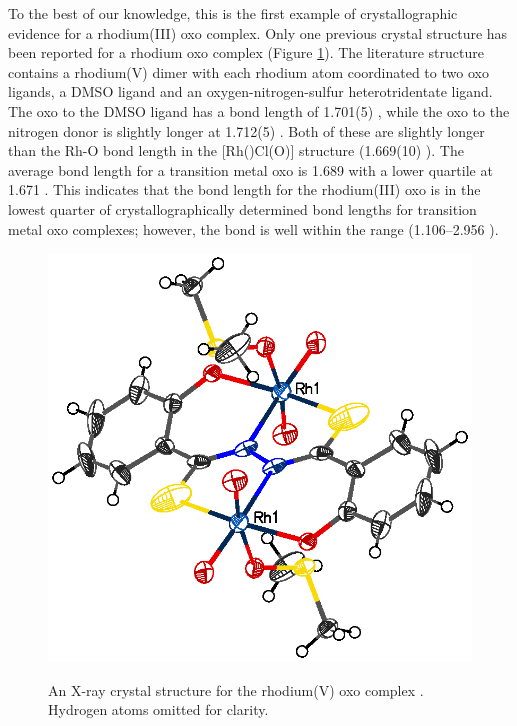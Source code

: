 To the best of our knowledge, this is the first example of crystallographic evidence for a rhodium(III) oxo complex. Only one previous crystal structure has been reported for a rhodium oxo complex (Figure \ref{Kaczul}).\cite{Gangopadhyay2010}  The literature structure contains a rhodium(V) dimer with each rhodium atom coordinated to two oxo ligands, a DMSO ligand and an oxygen-nitrogen-sulfur heterotridentate ligand.  The oxo \trans{} to the DMSO ligand has a bond length of 1.701(5) \A, while the oxo \trans{} to the nitrogen donor is slightly longer at 1.712(5) \A.  Both of these are slightly longer than the Rh-O bond length in the [Rh(\tBuxantphos)Cl(O)] structure (1.669(10) \A).  The average bond length for a transition metal oxo is 1.689 \A{} with a lower quartile at 1.671 \A.\cite{Allen2002}  This indicates that the bond length for the rhodium(III) oxo is in the lowest quarter of crystallographically determined bond lengths for transition metal oxo complexes; however, the bond is well within the range (1.106--2.956 \A).  

\begin{figure}[htb]
\begin{center}
\includegraphics[scale=0.8]{../Othercrystals/KACZUL2.eps}
\caption[A rhodium oxo crystal structure]{An X-ray crystal structure for the rhodium(V) oxo complex \ce{[(RhO2)2(C6H4(O)-C(=S)-N=N-C(=S)(O)C6H4)(DMSO)2]}.\cite{Gangopadhyay2010} Hydrogen atoms omitted for clarity.}
\vspace{0.2cm}
\label{Kaczul}
\end{center}
\end{figure}
\vspace{0.2cm}

